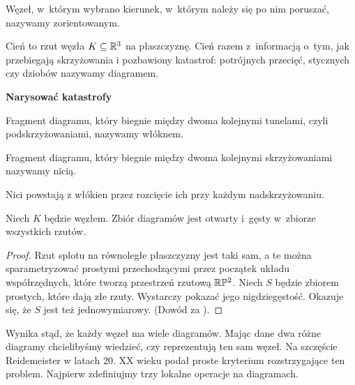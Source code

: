 \begin{definition}[orientacja]
    Węzeł, w~którym wybrano kierunek, w~którym należy się po nim poruszać, nazywamy zorientowanym.
\end{definition}

\begin{definition} [diagram] \label{def_diagrams}
    Cień to rzut węzła $K \subseteq \mathbb R^3$ na płaszczyznę.
    Cień razem z~informacją o~tym, jak przebiegają skrzyżowania i pozbawiony katastrof: potrójnych przecięć, stycznych czy dziobów nazywamy diagramem.
\end{definition}

{\color{red}\textbf{Narysować katastrofy}}

\begin{definition} [włókno]
    Fragment diagramu, który biegnie między dwoma kolejnymi tunelami, czyli podskrzyżowaniami, nazywamy włóknem.
\end{definition}

\begin{definition} [nić]
    Fragment diagramu, który biegnie między dwoma kolejnymi skrzyżowaniami nazywamy nicią.
\end{definition}

Nici powstają z włókien przez rozcięcie ich przy każdym nadskrzyżowaniu.

\begin{proposition}
    Niech $K$ będzie węzłem.
    Zbiór diagramów jest otwarty i~gęsty w~zbiorze wszystkich rzutów.
\end{proposition}

\begin{proof}
    Rzut splotu na równoległe płaszczyzny jest taki sam, a te można sparametryzować prostymi przechodzącymi przez początek układu współrzędnych, które tworzą przestrzeń rzutową $\mathbb R \mathbb P^2$.
    Niech $S$ będzie zbiorem prostych, które dają złe rzuty.
    Wystarczy pokazać jego nigdziegęstość.
    Okazuje się, że $S$ jest też jednowymiarowy.
    (Dowód za \cite{crowell63}).
\end{proof}

Wynika stąd, że każdy węzeł ma wiele diagramów.
Mając dane dwa różne diagramy chcielibyśmy wiedzieć, czy reprezentują ten sam węzeł.
Na szczęście Reidemeister w latach 20. XX wieku podał proste kryterium rozstrzygające ten problem.
Najpierw zdefiniujmy trzy lokalne operacje na diagramach.

